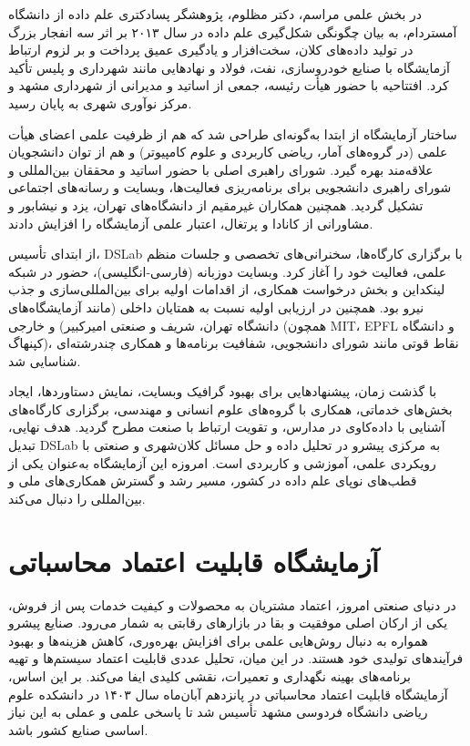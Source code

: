 \documentclass[
  letterpaper,
  DIV=11,
  numbers=noendperiod]{scrreprt}
\begin{document}
در بخش علمی مراسم، دکتر مظلوم، پژوهشگر پسادکتری علم داده از دانشگاه
آمستردام، به بیان چگونگی شکل‌گیری علم داده در سال ۲۰۱۳ بر اثر سه انفجار
بزرگ در تولید داده‌های کلان، سخت‌افزار و یادگیری عمیق پرداخت و بر لزوم
ارتباط آزمایشگاه با صنایع خودروسازی، نفت، فولاد و نهادهایی مانند شهرداری
و پلیس تأکید کرد. افتتاحیه با حضور هیأت رئیسه، جمعی از اساتید و مدیرانی
از شهرداری مشهد و مرکز نوآوری شهری به پایان رسید.

ساختار آزمایشگاه از ابتدا به‌گونه‌ای طراحی شد که هم از ظرفیت علمی اعضای
هیأت علمی (در گروه‌های آمار، ریاضی کاربردی و علوم کامپیوتر) و هم از توان
دانشجویان علاقه‌مند بهره گیرد. شورای راهبری اصلی با حضور اساتید و محققان
بین‌المللی و شورای راهبری دانشجویی برای برنامه‌ریزی فعالیت‌ها، وبسایت و
رسانه‌های اجتماعی تشکیل گردید. همچنین همکاران غیرمقیم از دانشگاه‌های
تهران، یزد و نیشابور و مشاورانی از کانادا و پرتغال، اعتبار علمی
آزمایشگاه را افزایش دادند.

از ابتدای تأسیس، DSLab با برگزاری کارگاه‌ها، سخنرانی‌های تخصصی و جلسات
منظم علمی، فعالیت خود را آغاز کرد. وبسایت دوزبانه (فارسی-انگلیسی)، حضور
در شبکه لینکداین و بخش درخواست همکاری، از اقدامات اولیه برای
بین‌المللی‌سازی و جذب نیرو بود. همچنین در ارزیابی اولیه نسبت به همتایان
داخلی (مانند آزمایشگاه‌های دانشگاه تهران، شریف و صنعتی امیرکبیر) و خارجی
(همچون MIT، EPFL و دانشگاه کپنهاگ)، نقاط قوتی مانند شورای دانشجویی،
شفافیت برنامه‌ها و همکاری چندرشته‌ای شناسایی شد.

با گذشت زمان، پیشنهادهایی برای بهبود گرافیک وبسایت، نمایش دستاوردها،
ایجاد بخش‌های خدماتی، همکاری با گروه‌های علوم انسانی و مهندسی، برگزاری
کارگاه‌های آشنایی با داده‌کاوی در مدارس، و تقویت ارتباط با صنعت مطرح
گردید. هدف نهایی، تبدیل DSLab به مرکزی پیشرو در تحلیل داده و حل مسائل
کلان‌شهری و صنعتی با رویکردی علمی، آموزشی و کاربردی است. امروزه این
آزمایشگاه به‌عنوان یکی از قطب‌های نوپای علم داده در کشور، مسیر رشد و گسترش
همکاری‌های ملی و بین‌المللی را دنبال می‌کند.

\section{آزمایشگاه قابلیت اعتماد
محاسباتی}\label{ux622ux632ux645ux627ux6ccux634ux6afux627ux647-ux642ux627ux628ux644ux6ccux62a-ux627ux639ux62aux645ux627ux62f-ux645ux62dux627ux633ux628ux627ux62aux6cc}

در دنیای صنعتی امروز، اعتماد مشتریان به محصولات و کیفیت خدمات پس از
فروش، یکی از ارکان اصلی موفقیت و بقا در بازارهای رقابتی به شمار می‌رود.
صنایع پیشرو همواره به دنبال روش‌هایی علمی برای افزایش بهره‌وری، کاهش
هزینه‌ها و بهبود فرآیندهای تولیدی خود هستند. در این میان، تحلیل عددی
قابلیت اعتماد سیستم‌ها و تهیه برنامه‌های بهینه نگهداری و تعمیرات، نقشی
کلیدی ایفا می‌کند. بر این اساس، آزمایشگاه قابلیت اعتماد محاسباتی در
پانزدهم آبان‌ماه سال ۱۴۰۳ در دانشکده علوم ریاضی دانشگاه فردوسی مشهد تأسیس
شد تا پاسخی علمی و عملی به این نیاز اساسی صنایع کشور باشد.
\end{document}
